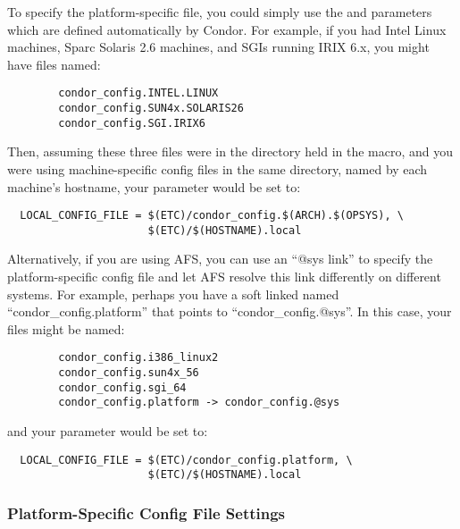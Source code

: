 To specify the platform-specific file, you could simply use the
 and  parameters which are defined
automatically by Condor.  For example, if you had Intel Linux
machines, Sparc Solaris 2.6 machines, and SGIs running IRIX 6.x, you
might have files named:

\begin{verbatim}
        condor_config.INTEL.LINUX
        condor_config.SUN4x.SOLARIS26
        condor_config.SGI.IRIX6
\end{verbatim}

Then, assuming these three files were in the directory held in the
 macro, and you were using machine-specific config files in
the same directory, named by each machine's hostname, your
 parameter would be set to:

\begin{verbatim}
  LOCAL_CONFIG_FILE = $(ETC)/condor_config.$(ARCH).$(OPSYS), \
                      $(ETC)/$(HOSTNAME).local
\end{verbatim}

Alternatively, if you are using AFS, you can use an ``@sys link'' to
specify the platform-specific config file and let AFS resolve this
link differently on different systems.  For example, perhaps you have
a soft linked named ``condor\_config.platform'' that points to
``condor\_config.@sys''.  In this case, your files might be named:

\begin{verbatim}
        condor_config.i386_linux2
        condor_config.sun4x_56
        condor_config.sgi_64
        condor_config.platform -> condor_config.@sys
\end{verbatim}

and your  parameter would be set to:

\begin{verbatim}
  LOCAL_CONFIG_FILE = $(ETC)/condor_config.platform, \
                      $(ETC)/$(HOSTNAME).local
\end{verbatim}

\subsubsection{\label{sec:Platform-Specific-Settings}Platform-Specific
Config File Settings}

